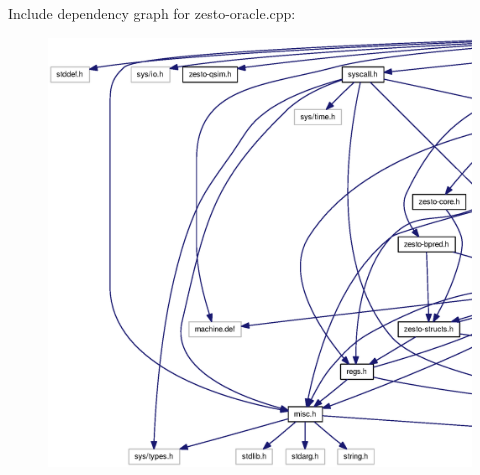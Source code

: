 Include dependency graph for zesto-oracle.cpp:\nopagebreak
\begin{figure}[H]
\begin{center}
\leavevmode
\includegraphics[width=420pt]{zesto-oracle_8cpp__incl}
\end{center}
\end{figure}
